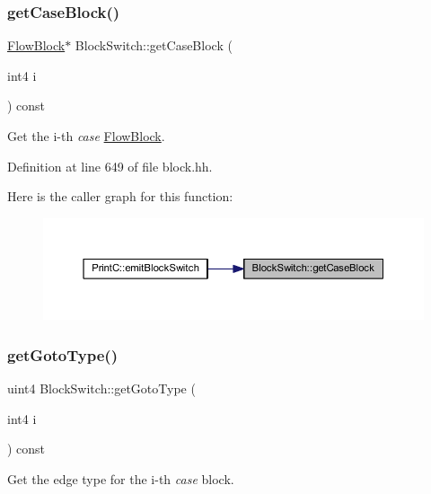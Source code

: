 \subsubsection{\texorpdfstring{getCaseBlock()}{getCaseBlock()}}
{\footnotesize\ttfamily \mbox{\hyperlink{class_flow_block}{Flow\+Block}}$\ast$ Block\+Switch\+::get\+Case\+Block (\begin{DoxyParamCaption}\item[{int4}]{i }\end{DoxyParamCaption}) const\hspace{0.3cm}{\ttfamily [inline]}}



Get the i-\/th {\itshape case} \mbox{\hyperlink{class_flow_block}{Flow\+Block}}. 



Definition at line 649 of file block.\+hh.

Here is the caller graph for this function\+:
\nopagebreak
\begin{figure}[H]
\begin{center}
\leavevmode
\includegraphics[width=350pt]{class_block_switch_a60c08166b6f3ae7c4ed03d622a843fc6_icgraph}
\end{center}
\end{figure}
\mbox{\label{class_block_switch_a053ffd21f364e19c3b1b6d7820be36dc}} 
\subsubsection{\texorpdfstring{getGotoType()}{getGotoType()}}
{\footnotesize\ttfamily uint4 Block\+Switch\+::get\+Goto\+Type (\begin{DoxyParamCaption}\item[{int4}]{i }\end{DoxyParamCaption}) const\hspace{0.3cm}{\ttfamily [inline]}}



Get the edge type for the i-\/th {\itshape case} block. 



